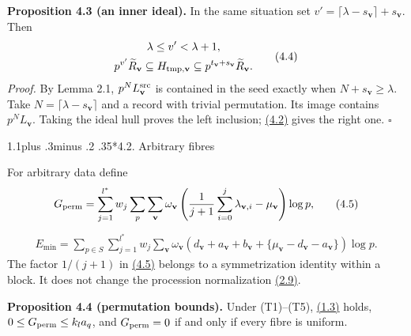 \documentclass[11pt,a4paper]{amsart}
\makeatletter
\renewcommand\subsection{\@startsection{subsection}{2}{\z@}
{1.1\baselineskip plus .3\baselineskip minus .2\baselineskip}
{.35\baselineskip}{\normalfont\bfseries}}
\makeatother
\begin{document}
\par\smallskip\noindent\textbf{Proposition 4.3 (an inner ideal).} In the same situation set $v'=\lceil\lambda-s_{\mathbf v}\rceil+s_{\mathbf v}$. Then
\begin{equation}
\begin{gathered}
\lambda\le v'<\lambda+1,\\
p^{v'}\widetilde R_{\mathbf v}\subseteq H_{{\rm tmp},\mathbf v}
\subseteq p^{t_{\mathbf v}+s_{\mathbf v}}\widetilde R_{\mathbf v}.
\end{gathered}
\tag{4.4}\label{eq:4.4}
\end{equation}
\emph{Proof.} By Lemma 2.1, $p^NL^{\rm src}_{\mathbf v}$ is contained in the seed exactly when $N+s_{\mathbf v}\ge\lambda$. Take $N=\lceil\lambda-s_{\mathbf v}\rceil$ and a record with trivial permutation. Its image contains $p^NL_{\mathbf v}$. Taking the ideal hull proves the left inclusion; \hyperref[eq:4.2]{(4.2)} gives the right one. \hfill$\square$


\subsection*{4.2. Arbitrary fibres}

For arbitrary data define
\begin{equation}
\begin{gathered}
G_{\rm perm}=\sum_{j=1}^{l^*}w_j\sum_p\sum_{\mathbf v}\omega_{\mathbf v}
\left({1\over j+1}\sum_{i=0}^j\lambda_{\mathbf v,i}-\mu_{\mathbf v}\right)\log p,
\end{gathered}
\tag{4.5}\label{eq:4.5}
\end{equation}
\begin{equation}
\begin{gathered}
E_{\min}=\sum_{p\in S}\sum_{j=1}^{l^*}w_j\sum_{\mathbf v}\omega_{\mathbf v}
\left(d_{\mathbf v}+a_{\mathbf v}+b_{\mathbf v}
+\{\mu_{\mathbf v}-d_{\mathbf v}-a_{\mathbf v}\}\right)\log p.
\end{gathered}
\tag{4.6}\label{eq:4.6}
\end{equation}
The factor $1/(j+1)$ in \hyperref[eq:4.5]{(4.5)} belongs to a symmetrization identity within a block. It does not change the procession normalization \hyperref[eq:2.9]{(2.9)}.


\par\smallskip\noindent\textbf{Proposition 4.4 (permutation bounds).} Under (T1)--(T5), \hyperref[eq:1.3]{(1.3)} holds, $0\le G_{\rm perm}\le k_la_q$, and $G_{\rm perm}=0$ if and only if every fibre is uniform.
\end{document}

